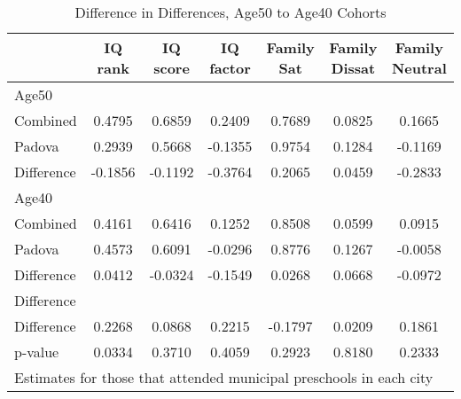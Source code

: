 \begin{table}[htbp]\centering
\caption{Difference in Differences, Age50 to Age40 Cohorts}
\begin{tabular}{l*{6}{c}}
\hline\hline
            &     IQ rank&    IQ score&   IQ factor&  Family Sat&Family Dissat&Family Neutral\\
\hline
Age50       &            &            &            &            &            &            \\
Combined    &      0.4795&      0.6859&      0.2409&      0.7689&      0.0825&      0.1665\\
Padova      &      0.2939&      0.5668&     -0.1355&      0.9754&      0.1284&     -0.1169\\
Difference  &     -0.1856&     -0.1192&     -0.3764&      0.2065&      0.0459&     -0.2833\\
\hline
Age40       &            &            &            &            &            &            \\
Combined    &      0.4161&      0.6416&      0.1252&      0.8508&      0.0599&      0.0915\\
Padova      &      0.4573&      0.6091&     -0.0296&      0.8776&      0.1267&     -0.0058\\
Difference  &      0.0412&     -0.0324&     -0.1549&      0.0268&      0.0668&     -0.0972\\
\hline
Difference  &            &            &            &            &            &            \\
Difference  &      0.2268&      0.0868&      0.2215&     -0.1797&      0.0209&      0.1861\\
p-value     &      0.0334&      0.3710&      0.4059&      0.2923&      0.8180&      0.2333\\
\hline\hline
\multicolumn{7}{l}{\footnotesize Estimates for those that attended municipal preschools in each city}\\
\end{tabular}
\end{table}
